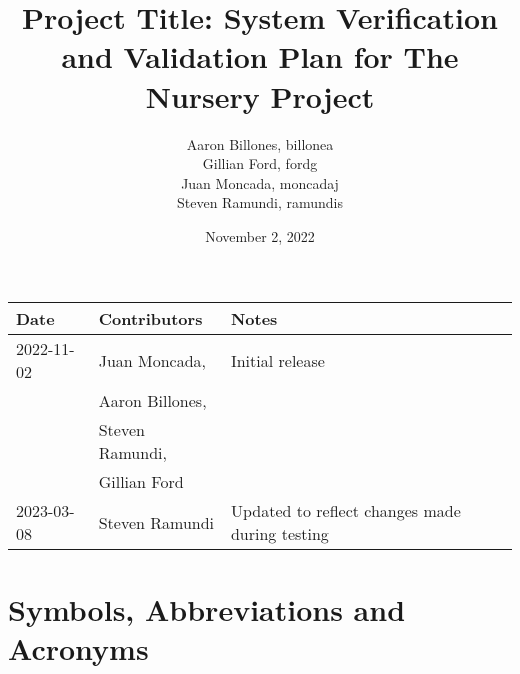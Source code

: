 \documentclass[12pt, titlepage]{article}
\begin{document}
\title{Project Title: System Verification and Validation Plan for The Nursery Project} 
\author{Aaron Billones, billonea\\Gillian Ford, fordg\\Juan Moncada, moncadaj\\Steven Ramundi, ramundis}

\date{November 2, 2022}


\maketitle
\thispagestyle{empty}




\begin{tabularx}{\textwidth}{p{3cm}p{4cm}X}
    \toprule {\bf Date} & {\bf Contributors} & {\bf Notes}\\
    \midrule
    2022-11-02 & Juan Moncada,& Initial release\\&Aaron Billones,\\&Steven Ramundi,\\&Gillian Ford \\
    2023-03-08 & Steven Ramundi & Updated to reflect changes made during testing\\
    \bottomrule
\end{tabularx}

\newpage

\tableofcontents

\listoftables

\newpage

\section{Symbols, Abbreviations and Acronyms}
\end{document}
